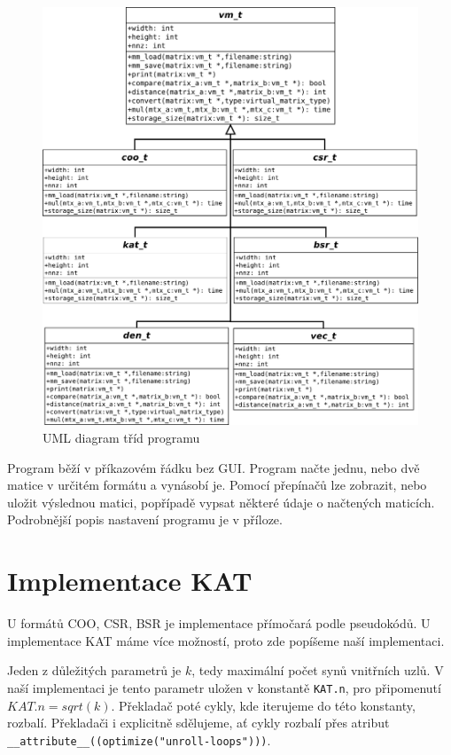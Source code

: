 \begin{figure}[htb]
	\includegraphics[width=1.0\textwidth]{./images/uml/uml}
	\caption{UML diagram tříd programu}
	\label{fig:uml}
\end{figure}

Program běží v příkazovém řádku bez GUI. Program načte jednu, nebo dvě matice v určitém formátu a vynásobí je. Pomocí přepínačů lze zobrazit, nebo uložit výslednou matici, popřípadě vypsat některé údaje o načtených maticích. Podrobnější popis nastavení programu je v příloze.


\section{Implementace KAT}

U formátů COO, CSR, BSR je implementace přímočará podle pseudokódů. U implementace KAT máme více možností, proto zde popíšeme naší implementaci.

Jeden z důležitých parametrů je $k$, tedy maximální počet synů vnitřních uzlů. V naší implementaci je tento parametr uložen v konstantě \texttt{KAT.n}, pro připomenutí $KAT.n = sqrt(k)$. Překladač poté cykly, kde iterujeme do této konstanty, rozbalí. Překladači i explicitně sdělujeme, ať cykly rozbalí přes atribut \texttt{\_\_attribute\_\_((optimize("unroll-loops")))}.

